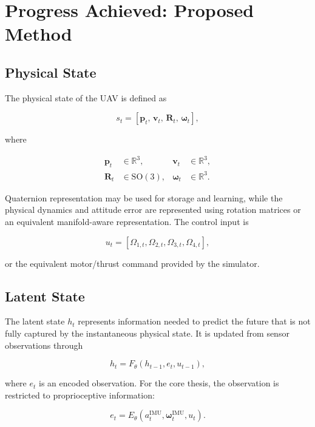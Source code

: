 \documentclass[conference]{IEEEtran}
\newcommand{\R}{\mathbb{R}}
\newcommand{\SO}{\mathrm{SO}(3)}
\begin{document}
\section{Progress Achieved: Proposed Method}


\subsection{Physical State}

The physical state of the UAV is defined as

\begin{equation}
s_t =
\left[
\mathbf{p}_t,\,
\mathbf{v}_t,\,
\mathbf{R}_t,\,
\boldsymbol{\omega}_t
\right],
\end{equation}

where

\begin{align}
\mathbf{p}_t &\in \R^3, &
\mathbf{v}_t &\in \R^3,\\
\mathbf{R}_t &\in \SO, &
\boldsymbol{\omega}_t &\in \R^3.
\end{align}

Quaternion representation may be used for storage and learning, while
the physical dynamics and attitude error are represented using
rotation matrices or an equivalent manifold-aware representation. The control input is

\begin{equation}
u_t =
[\Omega_{1,t},\Omega_{2,t},\Omega_{3,t},\Omega_{4,t}],
\end{equation}

or the equivalent motor/thrust command provided by the simulator.


\subsection{Latent State}

The latent state $h_t$ represents information needed to predict the
future that is not fully captured by the instantaneous physical state. It is updated from sensor observations through

\begin{equation}
h_t =
F_{\theta}
\left(
h_{t-1},
e_t,
u_{t-1}
\right),
\end{equation}

where $e_t$ is an encoded observation. For the core thesis, the observation is restricted to proprioceptive
information:

\begin{equation}
e_t =
E_{\theta}
\left(
a_t^{\mathrm{IMU}},
\boldsymbol{\omega}_t^{\mathrm{IMU}},
u_t
\right).
\end{equation}
\end{document}
